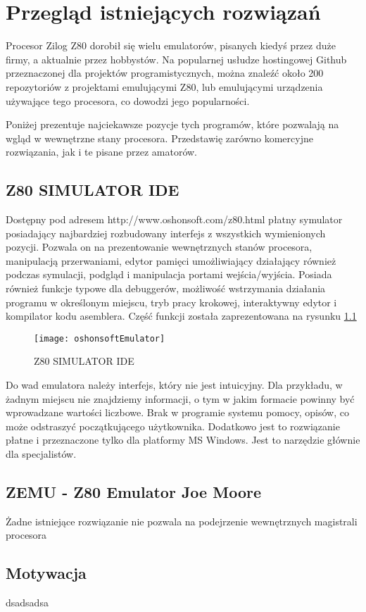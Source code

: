 \chapter{Przegląd istniejących rozwiązań}
	Procesor Zilog Z80 dorobił się wielu emulatorów, pisanych kiedyś przez duże firmy, a aktualnie przez hobbystów. Na popularnej usłudze hostingowej Github przeznaczonej dla projektów programistycznych, można znaleźć około 200 repozytoriów z projektami emulującymi Z80, lub emulującymi urządzenia używające tego procesora, co dowodzi jego popularności.\cite{githubZ80Emulators}   
	
	 Poniżej prezentuje najciekawsze pozycje tych programów, które pozwalają na wgląd w  wewnętrzne stany procesora. Przedstawię zarówno komercyjne rozwiązania, jak i te pisane przez amatorów.
	
	\section{Z80 SIMULATOR IDE}
	Dostępny pod adresem http://www.oshonsoft.com/z80.html płatny symulator posiadający najbardziej rozbudowany interfejs z wszystkich wymienionych pozycji. Pozwala on na prezentowanie wewnętrznych stanów procesora, manipulacją przerwaniami, edytor pamięci umożliwiający działający również podczas symulacji, podgląd i manipulacja portami wejścia/wyjścia. Posiada również funkcje typowe dla debuggerów, możliwość wstrzymania działania programu w określonym miejscu, tryb pracy krokowej, interaktywny edytor i kompilator kodu asemblera.\cite{oshonsoftEmulator} Część funkcji została zaprezentowana na rysunku \ref{img:oshonsoftEmulator} 
	
	\begin{figure}[h]
		\centering
		\texttt{[image: oshonsoftEmulator]}
		\caption{Z80 SIMULATOR IDE \cite{oshonsoftEmulator}}
		\label{img:oshonsoftEmulator}
	\end{figure}
	
	Do wad emulatora należy interfejs, który nie jest intuicyjny. Dla przykładu, w żadnym miejscu nie znajdziemy informacji, o tym w jakim formacie powinny być wprowadzane wartości liczbowe. Brak w programie systemu pomocy, opisów, co może odstraszyć początkującego użytkownika. Dodatkowo jest to rozwiązanie płatne i przeznaczone tylko dla platformy MS Windows. Jest to narzędzie głównie dla specjalistów.
	
	
	\section{ZEMU - Z80 Emulator Joe Moore}
	
	

	Żadne istniejące rozwiązanie nie pozwala na podejrzenie wewnętrznych magistrali procesora
	
	\section{Motywacja}
	dsadsadsa